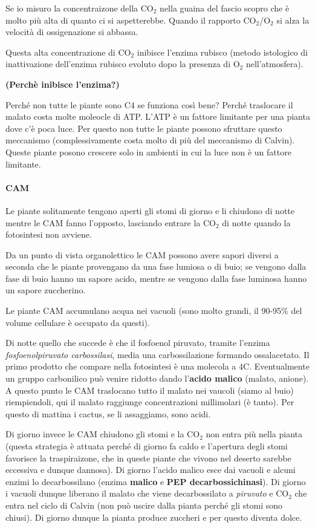 \documentclass[]{article}
\begin{document}
Se io misuro la concentraizone della CO$_2$ nella guaina del fascio
scopro che è molto più alta di quanto ci si aspetterebbe. Quando il
rapporto CO$_2$/O$_2$ si alza la velocità di ossigenazione si abbassa.

Questa alta concentrazione di CO$_2$ inibisce l'enzima rubisco (metodo
istologico di inattivazione dell'enzima rubisco evoluto dopo la presenza
di O$_2$ nell'atmosfera).

\textbf{(Perchè inibisce l'enzima?)}

Perché non tutte le piante sono C4 se funziona così bene? Perché
traslocare il malato costa molte moleocle di ATP. L'ATP è un fattore
limitante per una pianta dove c'è poca luce. Per questo non tutte le
piante possono sfruttare questo meccanismo (complessivamente costa molto
di più del meccanismo di Calvin). Queste piante posono crescere solo in
ambienti in cui la luce non è un fattore limitante.

\paragraph{CAM}\label{cam}

Le piante solitamente tengono aperti gli stomi di giorno e li chiudono
di notte mentre le CAM fanno l'opposto, lasciando entrare la CO$_2$ di
notte quando la fotosintesi non avviene.

Da un punto di vista organolettico le CAM possono avere sapori diversi a
seconda che le piante provengano da una fase lumiosa o di buio; se
vengono dalla fase di buio hanno un sapore acido, mentre se vengono
dalla fase luminosa hanno un sapore zuccherino.

Le piante CAM accumulano acqua nei vacuoli (sono molto grandi, il
90-95\% del volume cellulare è occupato da questi).

Di notte quello che succede è che il fosfoenol piruvato, tramite
l'enzima \emph{fosfoenolpiruvato carbossilasi}, media una
carbossilazione formando ossalacetato. Il primo prodotto che compare
nella fotosintesi è una molecola a 4C. Eventualmente un gruppo
carbonilico può venire ridotto dando l'\textbf{acido malico} (malato,
anione). A questo punto le CAM traslocano tutto il malato nei vaucoli
(siamo al buio) riempiendoli, qui il malato raggiunge concentrazioni
millimolari (è tanto). Per questo di mattina i cactus, se li assaggiamo,
sono acidi.

Di giorno invece le CAM chiudono gli stomi e la CO$_2$ non entra più
nella pianta (questa strategia è attuata perché di giorno fa caldo e
l'apertura degli stomi favorisce la traspiraizone, che in queste piante
che vivono nel deserto sarebbe eccessiva e dunque dannosa). Di giorno
l'acido malico esce dai vacuoli e alcuni enzimi lo decarbossilano
(enzima \textbf{malico} e \textbf{PEP decarbossichinasi}). Di giorno i
vacuoli dunque liberano il malato che viene decarbossilato a
\emph{piruvato} e CO$_2$ che entra nel ciclo di Calvin (non può uscire
dalla pianta perché gli stomi sono chiusi). Di giorno dunque la pianta
produce zuccheri e per questo diventa dolce.
\end{document}
